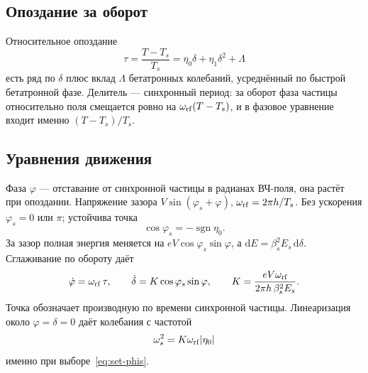 \subsection{Опоздание за оборот}

Относительное опоздание
\begin{equation}
\label{eq:set-tau}
\tau=\frac{T-T_s}{T_s}=\eta_0\delta+\eta_1\delta^2+\Lambda
\end{equation}
есть ряд по $\delta$ плюс вклад $\Lambda$ бетатронных колебаний, усреднённый по быстрой бетатронной фазе. Делитель --- синхронный период: за оборот фаза частицы относительно поля смещается ровно на $\omega_{\mathrm{rf}}(T-T_s)$, и в фазовое уравнение входит именно $(T-T_s)/T_s$.


\subsection{Уравнения движения}

Фаза $\varphi$ --- отставание от синхронной частицы в радианах ВЧ-поля, она растёт при опоздании. Напряжение зазора $V\sin(\varphi_s+\varphi)$, $\omega_{\mathrm{rf}}=2\pi h/T_s$. Без ускорения $\varphi_s=0$ или $\pi$; устойчива точка
\begin{equation}
\label{eq:set-phis}
\cos\varphi_s=-\operatorname{sgn}\eta_0 .
\end{equation}
За зазор полная энергия меняется на $eV\cos\varphi_s\sin\varphi$, а $\mathrm{d}E=\beta_s^2E_s\,\mathrm{d}\delta$. Сглаживание по обороту даёт
\begin{equation}
\label{eq:set-system}
\dot\varphi=\omega_{\mathrm{rf}}\,\tau,
\qquad
\dot\delta=K\cos\varphi_s\sin\varphi,
\qquad
K=\frac{eV\omega_{\mathrm{rf}}}{2\pi h\,\beta_s^2E_s}.
\end{equation}
Точка обозначает производную по времени синхронной частицы. Линеаризация около $\varphi=\delta=0$ даёт колебания с частотой
\begin{equation}
\label{eq:set-ws}
\omega_s^2=K\omega_{\mathrm{rf}}|\eta_0|
\end{equation}
именно при выборе~\eqref{eq:set-phis}.
